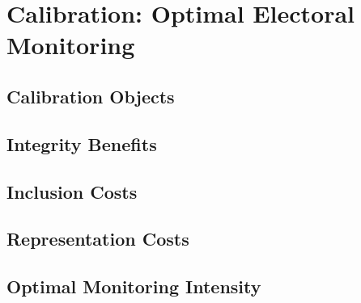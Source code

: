 \section{Calibration: Optimal Electoral Monitoring}
\label{sec:calibration}

\subsection{Calibration Objects}

\subsection{Integrity Benefits}

\subsection{Inclusion Costs}

\subsection{Representation Costs}

\subsection{Optimal Monitoring Intensity}
